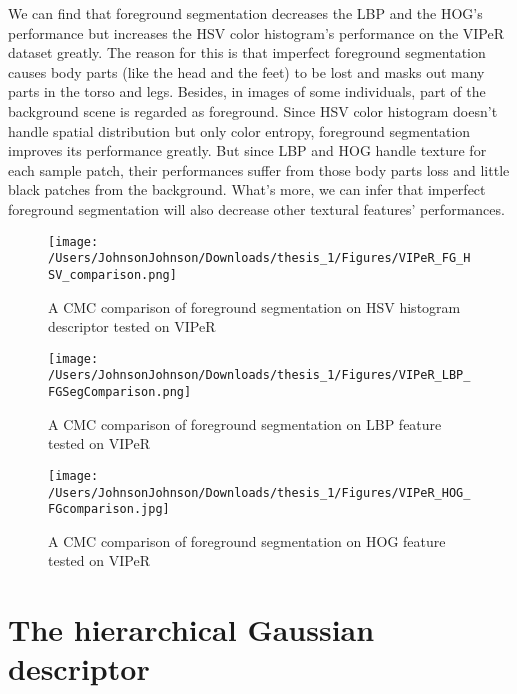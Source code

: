 We can find that foreground segmentation decreases the LBP and the HOG's performance but increases the HSV color histogram's performance on the VIPeR dataset greatly. The reason for this is that imperfect foreground segmentation causes body parts (like the head and the feet) to be lost and masks out many parts in the torso and legs. Besides, in images of some individuals, part of the background scene is regarded as foreground. Since HSV color histogram doesn't handle spatial distribution but only color entropy, foreground segmentation improves its performance greatly. But since LBP and HOG handle texture for each sample patch, their performances suffer from those body parts loss and little black patches from the background. What's more, we can infer that imperfect foreground segmentation will also decrease other textural features' performances.
\begin{figure}
\centering
\texttt{[image: /Users/JohnsonJohnson/Downloads/thesis\_1/Figures/VIPeR\_FG\_HSV\_comparison.png]}
\caption{A CMC comparison of foreground segmentation on HSV histogram descriptor tested on VIPeR}
\label{fig:SegHSV}
\vspace{-1em}
\end{figure} 

\begin{figure}
\centering
\texttt{[image: /Users/JohnsonJohnson/Downloads/thesis\_1/Figures/VIPeR\_LBP\_FGSegComparison.png]}
\caption{A CMC comparison of foreground segmentation on LBP feature tested on VIPeR }
\label{fig:SegLBP}
\vspace{-1em}
\end{figure} 

\begin{figure}
\centering
\texttt{[image: /Users/JohnsonJohnson/Downloads/thesis\_1/Figures/VIPeR\_HOG\_FGcomparison.jpg]}
\caption{A CMC comparison of foreground segmentation on HOG feature tested on VIPeR}
\label{fig:SegHOG}
\vspace{-1em}
\end{figure} 

\section{The hierarchical Gaussian descriptor}

